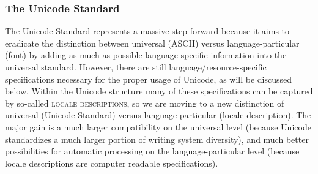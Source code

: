 \subsubsection*{The Unicode Standard}

The Unicode Standard represents a massive step forward because it aims to
eradicate the distinction between universal (ASCII) versus language-particular
(font) by adding as much as possible language-specific information into the
universal standard. However, there are still language/resource-specific
specifications necessary for the proper usage of Unicode, as will be discussed
below. Within the Unicode structure many of these specifications can be captured
by so-called \textsc{locale descriptions}, so we are moving to a new distinction
of universal (Unicode Standard) versus language-particular (locale description).
The major gain is a much larger compatibility on the universal level (because
Unicode standardizes a much larger portion of writing system diversity), and
much better possibilities for automatic processing on the language-particular
level (because locale descriptions are computer readable specifications).

